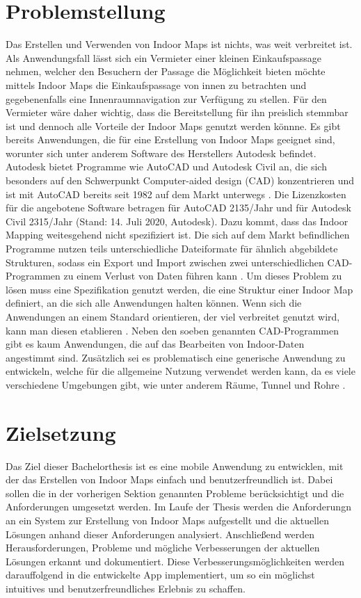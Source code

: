 \section{Problemstellung}
\label{sec:problems}
Das Erstellen und Verwenden von Indoor Maps ist nichts, was weit verbreitet ist.
Als Anwendungsfall lässt sich ein Vermieter einer kleinen Einkaufspassage nehmen, welcher den Besuchern der Passage die Möglichkeit bieten möchte mittels Indoor Maps die Einkaufspassage von innen zu betrachten und gegebenenfalls eine Innenraumnavigation zur Verfügung zu stellen.
Für den Vermieter wäre daher wichtig, dass die Bereitstellung für ihn preislich stemmbar ist und dennoch alle Vorteile der Indoor Maps genutzt werden könnne.\pbreak%
%
Es gibt bereits Anwendungen, die für eine Erstellung von Indoor Maps geeignet sind, worunter sich unter anderem Software des Herstellers Autodesk befindet.
Autodesk bietet Programme wie AutoCAD und Autodesk Civil an, die sich besonders auf den Schwerpunkt Computer-aided design (CAD) konzentrieren und ist mit AutoCAD bereits seit 1982 auf dem Markt unterwegs \parencite{HUR2008}.
Die Lizenzkosten für die angebotene Software betragen für AutoCAD \SI{2135}{\eur}/Jahr und für Autodesk Civil \SI{2315}{\eur}/Jahr (Stand: 14. Juli 2020, Autodesk).\pbreak%
%
Dazu kommt, dass das Indoor Mapping weitesgehend nicht spezifiziert ist.
Die sich auf dem Markt befindlichen Programme nutzen teils unterschiedliche Dateiformate für ähnlich abgebildete Strukturen, sodass ein Export und Import zwischen zwei unterschiedlichen CAD-Programmen zu einem Verlust von Daten führen kann \parencite[65]{GEL2019, ZLA2013}.
Um dieses Problem zu lösen muss eine Spezifikation genutzt werden, die eine Struktur einer Indoor Map definiert, an die sich alle Anwendungen halten können.
Wenn sich die Anwendungen an einem Standard orientieren, der viel verbreitet genutzt wird, kann man diesen etablieren \parencite{GEL2019}.\pbreak%
%
Neben den soeben genannten CAD-Programmen gibt es kaum Anwendungen, die auf das Bearbeiten von Indoor-Daten angestimmt sind.
Zusätzlich sei es problematisch eine generische Anwendung zu entwickeln, welche für die allgemeine Nutzung verwendet werden kann, da es viele verschiedene Umgebungen gibt, wie unter anderem Räume, Tunnel und Rohre \parencite[65]{ZLA2013}.

\section{Zielsetzung}
Das Ziel dieser Bachelorthesis ist es eine mobile Anwendung zu entwicklen, mit der das Erstellen von Indoor Maps einfach und benutzerfreundlich ist.
Dabei sollen die in der vorherigen Sektion genannten Probleme berücksichtigt und die Anforderungen umgesetzt werden.
Im Laufe der Thesis werden die Anforderungn an ein System zur Erstellung von Indoor Maps aufgestellt und die aktuellen Lösungen anhand dieser Anforderungen analysiert.
Anschließend werden Herausforderungen, Probleme und mögliche Verbesserungen der aktuellen Lösungen erkannt und dokumentiert.
Diese Verbesserungsmöglichkeiten werden darauffolgend in die entwickelte App implementiert, um so ein möglichst intuitives und benutzerfreundliches Erlebnis zu schaffen.
